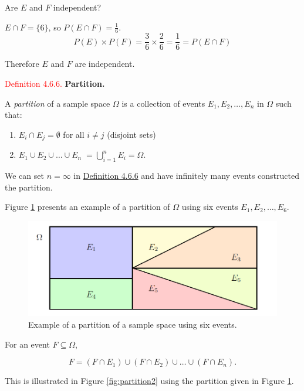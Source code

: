 \documentclass[
]{book}
\providecommand{\tightlist}{%
  \setlength{\itemsep}{0pt}\setlength{\parskip}{0pt}}
\begin{document}
Are \(E\) and \(F\) independent?

\(E \cap F = \{6 \}\), so \(P(E \cap F) = \frac{1}{6}\).\\

\[P(E) \times P(F) = \frac{3}{6} \times \frac{2}{6} = \frac{1}{6} = P(E \cap F) \]

Therefore \(E\) and \(F\) are independent.

\leavevmode{}%
\textcolor{red}{Definition 4.6.6.}
{\textbf{Partition.}}

A \emph{partition} of a sample space \(\Omega\) is a collection of events \(E_{1}, E_{2}, \ldots,E_n\) in \(\Omega\) such that:

\begin{enumerate}
\def\labelenumi{\roman{enumi}.}
\tightlist
\item
  \(E_{i} \cap E_{j} = \emptyset\) for all \(i \neq j\) (disjoint sets)\\
\item
  \(E_{1} \cup E_{2} \cup \ldots \cup E_n \; = \bigcup_{i=1}^n E_i = \Omega\).\\
\end{enumerate}

We can set \(n=\infty\) in \protect\hyperlink{prob:partition}{Definition 4.6.6} and have infinitely many events constructed the partition.

Figure \ref{fig:partition1} presents an example of a partition of \(\Omega\) using six events
\(E_1,E_2, \ldots, E_6\).

\begin{figure}
\includegraphics[width=0.8\linewidth]{Images/partition1} \caption{Example of a partition of a sample space using six events.}\label{fig:partition1}
\end{figure}

For an event \(F \subseteq \Omega\),

\[ F = (F \cap E_1) \cup (F \cap E_2 ) \cup \ldots \cup (F \cap E_n ). \]

This is illustrated in Figure \ref{fig:partition2} using the partition given in Figure \ref{fig:partition1}.
\end{document}
